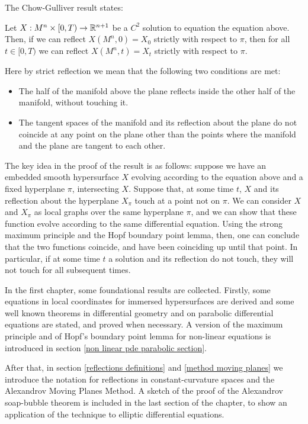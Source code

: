 The Chow-Gulliver result states:

\begin{theorem*}
	Let $X:M^n\times [0,T) \rightarrow \mathbb{R}^{n+1}$ be a $C^2$ solution to equation the equation above. Then, if we can reflect $X(M^n, 0)=X_0$ strictly with respect to $\pi$, then for all $t\in [0,T)$ we can reflect $X(M^n, t)=X_t$ strictly with respect to $\pi$. 
\end{theorem*}

Here by strict reflection we mean that the following two conditions are met: 
\begin{itemize}
	\item The half of the manifold above the plane reflects inside the other half of the manifold, without touching it.
	\item The tangent spaces of the manifold and its reflection about the plane do not coincide at any point on the plane other than the points where the manifold and the plane are tangent to each other.
\end{itemize}

The key idea in the proof of the result is as follows: suppose we have an embedded smooth hypersurface $X$ evolving according to the equation above and a fixed hyperplane $\pi$, intersecting $X$. Suppose that, at some time $t$, $X$ and  its reflection about the hyperplane $X_\pi$ touch at a point not on $\pi$. We can consider $X$ and  $X_\pi$ as local graphs over the same hyperplane $\pi$, and we can show that these function evolve according to the same differential equation. Using the strong maximum principle and the Hopf boundary point lemma, then, one can conclude that the two functions coincide, and have been coinciding up until that point. In particular, if at some time $t$ a solution and its reflection do not touch, they will not touch for all subsequent times. 

In the first chapter, some foundational results are collected. Firstly, some equations in local coordinates for immersed hypersurfaces are derived and some well known theorems in differential geometry and on parabolic differential equations are stated, and proved when necessary. A version of the maximum principle and of Hopf's boundary point lemma for non-linear equations is introduced in section \ref{non linear pde parabolic section}.

After that, in section \ref{reflections definitions} and 
\ref{method moving planes} we introduce the notation for reflections in constant-curvature spaces and the Alexandrov Moving Planes Method. A sketch of the proof of the Alexandrov soap-bubble theorem is included in the last section of the chapter, to show an application of the technique to elliptic differential equations. 


